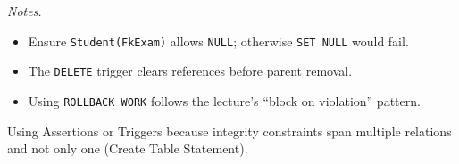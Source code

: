 \documentclass{article}
\begin{document}
\begin{subtasks}
\textit{Notes.}
\begin{itemize}
  \item Ensure \texttt{Student(FkExam)} allows \texttt{NULL}; otherwise \texttt{SET NULL} would fail.
  \item The \texttt{DELETE} trigger clears references before parent removal.
  \item Using \texttt{ROLLBACK WORK} follows the lecture’s “block on violation” pattern.
\end{itemize}

\end{subtasks}

\task{}

Using Assertions or Triggers
because integrity constraints span multiple relations and not only one (Create Table Statement).
\end{document}
